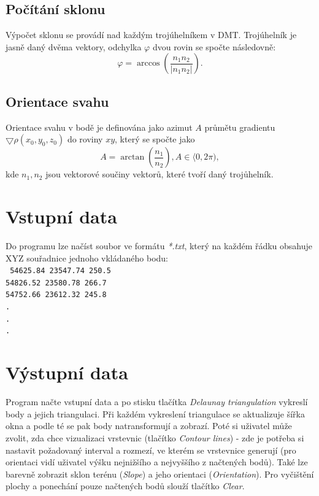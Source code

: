 \documentclass{article}
\begin{document}
\subsection{Počítání sklonu} 
\indent Výpočet sklonu se provádí nad každým trojúhelníkem v DMT. Trojúhelník je jasně daný dvěma vektory, odchylka $\varphi$ dvou rovin se spočte následovně: 
$$\varphi = \arccos(\frac{n_1n_2}{|n_1n_2|}).$$
\subsection{Orientace svahu}
\indent Orientace svahu v bodě je definována jako azimut $A$ průmětu gradientu $\bigtriangledown\rho(x_0,y_0,z_0)$ do roviny $xy$, který se spočte jako
$$A = \arctan(\frac{n_1}{n_2}), A\in\langle0,2\pi),$$
kde $n_1, n_2$ jsou vektorové součiny vektorů, které tvoří daný trojůhelník.

\section{Vstupní data}
\indent Do programu lze načíst soubor ve formátu \textit{*.txt}, který na každém řádku obsahuje XYZ souřadnice jednoho vkládaného bodu: \\
\texttt{
54625.84 23547.74 250.5 \\
54826.52 23580.78 266.7 \\
54752.66 23612.32 245.8 \\
.\\
.\\
.}
\section{Výstupní data}
\indent Program načte vstupní data a po stisku tlačítka \textit{Delaunay triangulation} vykreslí body a jejich triangulaci. Při každém vykreslení triangulace se aktualizuje šířka okna a podle té se pak body natransformují a zobrazí.
\indent Poté si uživatel může zvolit, zda chce vizualizaci vrstevnic (tlačítko \textit{Contour lines}) - zde je potřeba si nastavit požadovaný interval a rozmezí, ve kterém se vrstevnice generují (pro orientaci vidí uživatel výšku nejnižšího a nejvyššího z načtených bodů). Také lze barevně zobrazit sklon terénu (\textit{Slope}) a  jeho orientaci (\textit{Orientation}). Pro vyčištění plochy a ponechání pouze načtených bodů slouží tlačítko \textit{Clear}. \\
\end{document}
